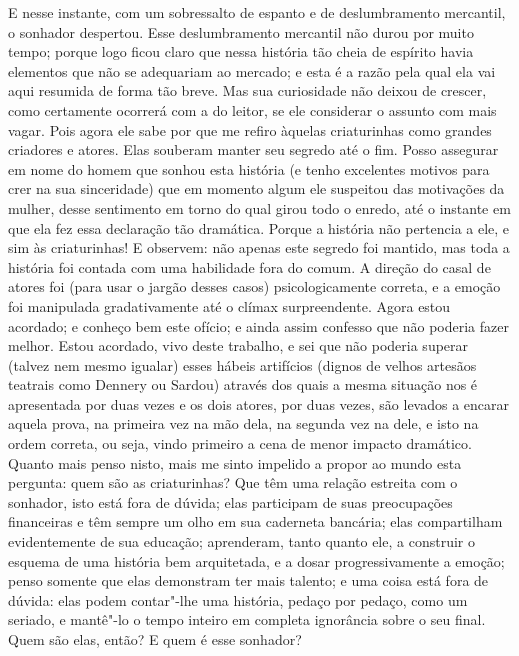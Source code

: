E nesse instante, com um sobressalto de espanto e de deslumbramento
mercantil, o sonhador despertou.  Esse deslumbramento mercantil não
durou por muito tempo; porque logo ficou claro que nessa história tão
cheia de espírito havia elementos que não se adequariam ao mercado; e
esta é a razão pela qual ela vai aqui resumida de forma tão breve.  Mas
sua curiosidade não deixou de crescer, como certamente ocorrerá com a
do leitor, se ele considerar o assunto com mais vagar.  Pois agora
ele sabe por que me refiro àquelas criaturinhas como grandes
criadores e atores.  Elas souberam manter seu segredo até o fim.  Posso
assegurar em nome do homem que sonhou esta história (e tenho excelentes
motivos para crer na sua sinceridade) que em momento algum ele
suspeitou das motivações da mulher, desse sentimento em torno do qual
girou todo o enredo, até o instante em que ela fez essa declaração tão
dramática.  Porque a história não pertencia a ele, e sim às
criaturinhas!  E observem: não apenas este segredo foi mantido, mas
toda a história foi contada com uma habilidade fora do comum.  A
direção do casal de atores foi (para usar o jargão desses casos)
psicologicamente correta, e a emoção foi manipulada gradativamente até
o clímax surpreendente.  Agora estou acordado; e conheço bem este
ofício; e ainda assim confesso que não poderia fazer melhor.  Estou
acordado, vivo deste trabalho, e sei que não poderia superar (talvez
nem mesmo igualar) esses hábeis artifícios (dignos de velhos artesãos
teatrais como Dennery ou Sardou) através dos quais a mesma situação nos
é apresentada por duas vezes e os dois atores, por duas vezes, são
levados a encarar aquela prova, na primeira vez na mão dela, na segunda
vez na dele, e isto na ordem correta, ou seja, vindo primeiro a cena de
menor impacto dramático.  Quanto mais penso nisto, mais me sinto
impelido a propor ao mundo esta pergunta: quem são as criaturinhas? 
Que têm uma relação estreita com o sonhador, isto está fora de dúvida;
elas participam de suas preocupações financeiras e têm sempre um olho
em sua caderneta bancária; elas compartilham evidentemente de sua
educação; aprenderam, tanto quanto ele, a construir o esquema de uma
história bem arquitetada, e a dosar progressivamente a emoção; penso
somente que elas demonstram ter mais talento; e uma coisa está fora de
dúvida: elas podem contar"-lhe uma história, pedaço por pedaço, como um
seriado, e mantê"-lo o tempo inteiro em completa ignorância sobre o seu       
final.  Quem são elas, então?  E quem é esse sonhador?

